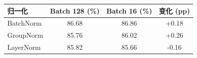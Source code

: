 \begin{tabular}{lccc}
\toprule
归一化 & Batch 128 (\%) & Batch 16 (\%) & 变化 (pp) \\
\midrule
BatchNorm & 86.68 & 86.86 & +0.18 \\
GroupNorm & 85.76 & 86.02 & +0.26 \\
LayerNorm & 85.82 & 85.66 & -0.16 \\
\bottomrule
\end{tabular}
